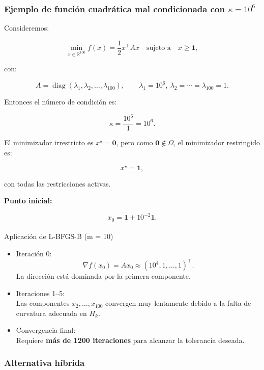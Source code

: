 \documentclass[
  spanish,
  us-letterpaper,
]{scrreprt}
\makeatletter
\let\oldparagraph\paragraph
\renewcommand{\paragraph}{
    \@ifstar
      \xxxParagraphStar
      \xxxParagraphNoStar
  }
\newcommand{\xxxParagraphStar}[1]{\oldparagraph*{#1}\mbox{}}
\newcommand{\xxxParagraphNoStar}[1]{\oldparagraph{#1}\mbox{}}
\numberwithin{equation}{section}
\makeatother
\begin{document}
\subsubsection{\texorpdfstring{Ejemplo de función cuadrática mal
condicionada con
\(\kappa = 10^6\)}{Ejemplo de función cuadrática mal condicionada con \textbackslash kappa = 10\^{}6}}\label{ejemplo-de-funciuxf3n-cuadruxe1tica-mal-condicionada-con-kappa-106}

Consideremos:

\[
\min_{x \in \mathbb{R}^{100}} f(x) = \frac{1}{2} x^\top A x
\quad \text{sujeto a} \quad
x \ge \mathbf{1},
\]

con:

\[
A = \operatorname{diag}(\lambda_1,\lambda_2,\dots,\lambda_{100}), \qquad
\lambda_1 = 10^6,\ \lambda_2=\cdots=\lambda_{100}=1.
\]

Entonces el número de condición es:

\[
\kappa = \frac{10^6}{1} = 10^6.
\]

El minimizador irrestricto es \(x^\star = \mathbf{0}\), pero como
\(\mathbf{0} \notin \Omega\), el minimizador restringido es:

\[
x^\star = \mathbf{1},
\]

con todas las restricciones activas.

\textbf{Punto inicial:}

\[
x_0 = \mathbf{1} + 10^{-2}\mathbf{1}.
\]

\paragraph{Aplicación de L-BFGS-B (m =
10)}\label{aplicaciuxf3n-de-l-bfgs-b-m-10}

\begin{itemize}
\item
  Iteración 0:\\
  \[\nabla f(x_0) = A x_0 \approx (10^4, 1,\dots,1)^\top.\] La dirección
  está dominada por la primera componente.
\item
  Iteraciones 1--5:\\
  Las componentes \(x_2,\dots,x_{100}\) convergen muy lentamente debido
  a la falta de curvatura adecuada en \(H_k\).
\item
  Convergencia final:\\
  Requiere \textbf{más de 1200 iteraciones} para alcanzar la tolerancia
  deseada.
\end{itemize}

\subsubsection{Alternativa híbrida}\label{alternativa-huxedbrida}
\end{document}
